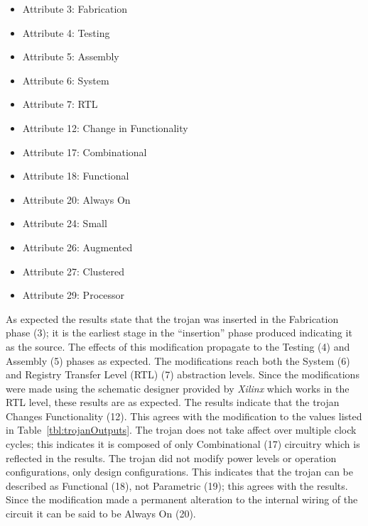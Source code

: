 \documentclass[journal, hidelinks]{IEEEtran}
\begin{document}
\begin{itemize}
	\item Attribute 3: Fabrication
	\item Attribute 4: Testing
	\item Attribute 5: Assembly
	\item Attribute 6: System
	\item Attribute 7: RTL
	\item Attribute 12: Change in Functionality
	\item Attribute 17: Combinational
	\item Attribute 18: Functional
	\item Attribute 20: Always On
	\item Attribute 24: Small
	\item Attribute 26: Augmented
	\item Attribute 27: Clustered
	\item Attribute 29: Processor
\end{itemize}

As expected the results state that the trojan was inserted in the Fabrication phase (3); it is the earliest stage in the ``insertion'' phase produced indicating it as the source.
The effects of this modification propagate to the Testing (4) and Assembly (5) phases as expected.
The modifications reach both the System (6) and Registry Transfer Level (RTL) (7) abstraction levels.
Since the modifications were made using the schematic designer provided by \textit{Xilinx} which works in the RTL level, these results are as expected.
The results indicate that the trojan Changes Functionality (12). 
This agrees with the modification to the values listed in Table~\ref{tbl:trojanOutputs}.
The trojan does not take affect over multiple clock cycles; this indicates it is composed of only Combinational (17) circuitry which is reflected in the results.
The trojan did not modify power levels or operation configurations, only design configurations.
This indicates that the trojan can be described as Functional (18), not Parametric (19); this agrees with the results.
Since the modification made a permanent alteration to the internal wiring of the circuit it can be said to be Always On (20).
\end{document}
